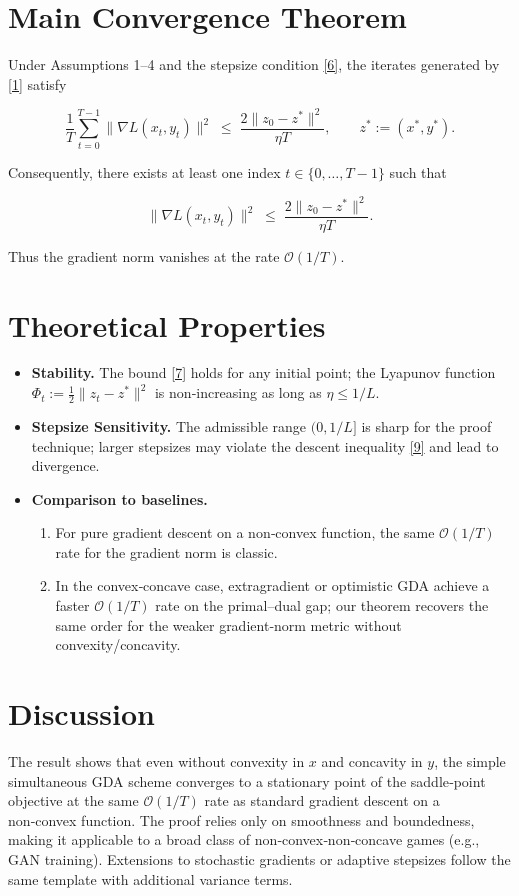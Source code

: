 \section*{Main Convergence Theorem}
\begin{theorem}\label{thm:main}
Under Assumptions 1–4 and the stepsize condition \eqref{6}, the iterates generated by \eqref{1} satisfy  

\[
\frac{1}{T}\sum_{t=0}^{T-1}\bigl\|\nabla L(x_{t},y_{t})\bigr\|^{2}
\;\le\;
\frac{2\bigl\|z_{0}-z^{*}\bigr\|^{2}}{\eta T},
\qquad
z^{*}:=(x^{*},y^{*}).
\tag{7}
\]

Consequently, there exists at least one index \(t\in\{0,\dots,T-1\}\) such that  

\[
\bigl\|\nabla L(x_{t},y_{t})\bigr\|^{2}
\;\le\;
\frac{2\bigl\|z_{0}-z^{*}\bigr\|^{2}}{\eta T}.
\tag{8}
\]

Thus the gradient norm vanishes at the rate \(\mathcal O(1/T)\).
\end{theorem}

\section*{Theoretical Properties}
\begin{itemize}
\item \textbf{Stability.} The bound \eqref{7} holds for any initial point; the Lyapunov function \(\Phi_{t}:=\tfrac12\|z_{t}-z^{*}\|^{2}\) is non‑increasing as long as \(\eta\le 1/L\).
\item \textbf{Stepsize Sensitivity.} The admissible range \((0,1/L]\) is sharp for the proof technique; larger stepsizes may violate the descent inequality \eqref{9} and lead to divergence.
\item \textbf{Comparison to baselines.}
    \begin{enumerate}
    \item For pure gradient descent on a non‑convex function, the same \(\mathcal O(1/T)\) rate for the gradient norm is classic.
    \item In the convex‑concave case, extragradient or optimistic GDA achieve a faster \(\mathcal O(1/T)\) rate on the primal–dual gap; our theorem recovers the same order for the weaker gradient‑norm metric without convexity/concavity.
    \end{enumerate}
\end{itemize}

\section*{Discussion}
The result shows that even without convexity in \(x\) and concavity in \(y\), the simple simultaneous GDA scheme converges to a stationary point of the saddle‑point objective at the same \(\mathcal O(1/T)\) rate as standard gradient descent on a non‑convex function. The proof relies only on smoothness and boundedness, making it applicable to a broad class of non‑convex‑non‑concave games (e.g., GAN training). Extensions to stochastic gradients or adaptive stepsizes follow the same template with additional variance terms.


